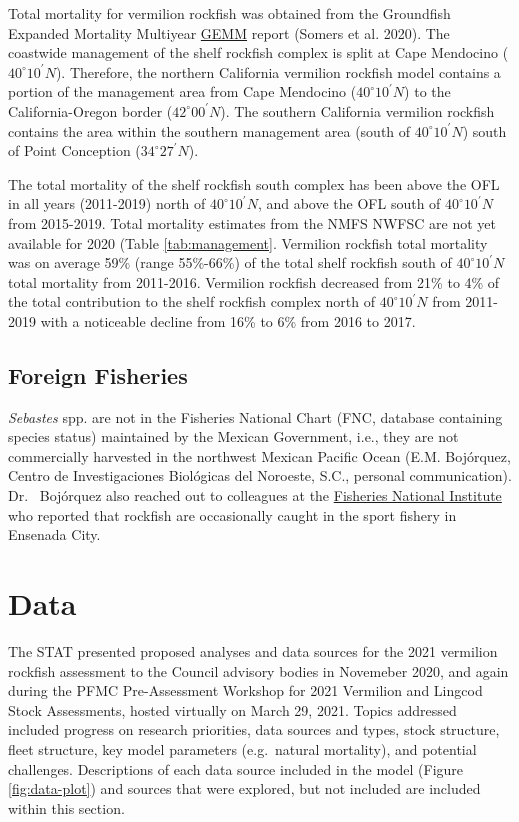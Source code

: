 \documentclass[
  english,
  a4paper,
]{article}
\begin{document}
Total mortality for vermilion rockfish was obtained from the Groundfish Expanded Mortality
Multiyear \href{https://www.nwfsc.noaa.gov/data/api/v1/source/observer.gemm_fact/selection.xlsx}{GEMM}
report (Somers et al. 2020). The coastwide management of the shelf rockfish complex is split at Cape
Mendocino ($40^\circ 10^\prime N$). Therefore, the northern California vermilion rockfish
model contains a portion of the management area from Cape Mendocino ($40^\circ 10^\prime N$)
to the California-Oregon border ($42^\circ 00^\prime N$). The southern California vermilion rockfish contains the
area within the southern management area (south of $40^\circ 10^\prime N$) south of Point Conception ($34^\circ 27^\prime N$).

The total mortality of the shelf rockfish
south complex has been above the OFL in all years (2011-2019) north of $40^\circ 10^\prime N$, and
above the OFL south of $40^\circ 10^\prime N$ from 2015-2019. Total mortality
estimates from the NMFS NWFSC are not yet available for 2020 (Table \ref{tab:management}. Vermilion rockfish total
mortality was on average 59\% (range 55\%-66\%) of the total shelf rockfish south
of $40^\circ 10^\prime N$ total mortality from 2011-2016. Vermilion rockfish decreased from 21\% to 4\% of
the total contribution to the shelf rockfish complex north of $40^\circ 10^\prime N$ from 2011-2019 with a
noticeable decline from 16\% to 6\% from 2016 to 2017.

\hypertarget{foreign-fisheries}{%
\subsection{Foreign Fisheries}\label{foreign-fisheries}}

\emph{Sebastes} spp. are not in the Fisheries National Chart (FNC, database containing
species status) maintained by the Mexican Government, i.e., they are not commercially
harvested in the northwest Mexican Pacific Ocean (E.M. Bojórquez, Centro de
Investigaciones Biológicas del Noroeste, S.C., personal communication). Dr.~
Bojórquez also reached out to colleagues at the
\href{https://www.gob.mx/inapesca}{Fisheries National Institute} who reported that rockfish
are occasionally caught in the sport fishery in Ensenada City.

\hypertarget{data}{%
\section{Data}\label{data}}

The STAT presented proposed analyses and data sources for the 2021 vermilion rockfish
assessment to the Council advisory bodies in Novemeber 2020, and again during the PFMC Pre-Assessment Workshop for 2021 Vermilion and
Lingcod Stock Assessments, hosted virtually on March 29, 2021. Topics addressed
included progress on research priorities, data sources and types, stock structure,
fleet structure, key model parameters (e.g.~natural mortality), and potential
challenges. Descriptions of each data source included in the model
(Figure \ref{fig:data-plot}) and sources that were explored, but not included
are included within this section.
\end{document}
